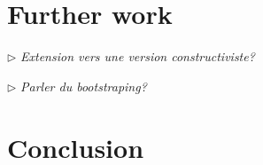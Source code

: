 \documentclass{article}
\newcommand{\remtext}[1]{\textcolor{bwgreen}{$\triangleright$ \textsl{#1}}}
\begin{document}
\section{Further work}
\label{fw}

\remtext{Extension vers une version constructiviste?}

\remtext{Parler du bootstraping?}

\section{Conclusion}








\end{document}
